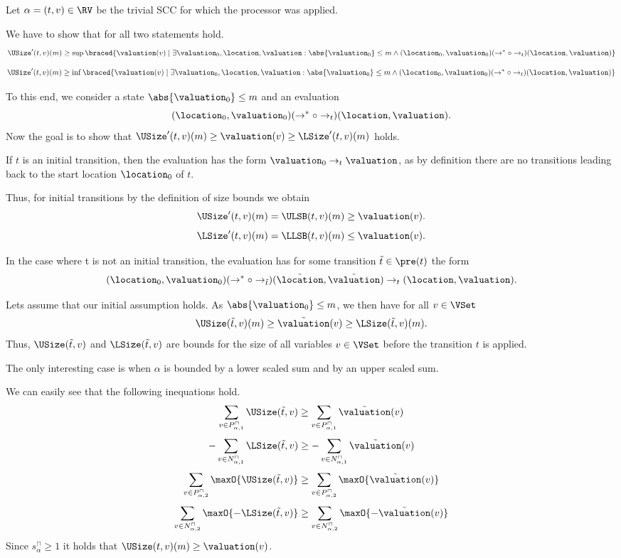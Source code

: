 Let $\alpha = (t, v) \in \RV$ be the trivial SCC for which the processor was applied.

We have to show that for all  two statements hold.
\[ \USize'(t, v)(m) \geq \sup \braced{ \valuation(v) \mid \exists \valuation_0, \location, \valuation: \abs{\valuation_0} \leq m \wedge (\location_0, \valuation_0) (\rightarrow^* \circ \rightarrow_t) (\location, \valuation)} \]
\[ \USize'(t, v)(m) \geq \inf \braced{ \valuation(v) \mid \exists \valuation_0, \location, \valuation: \abs{\valuation_0} \leq m \wedge (\location_0, \valuation_0) (\rightarrow^* \circ \rightarrow_t) (\location, \valuation)} \]

To this end, we consider a state $\abs{\valuation_0} \leq m$ and an evaluation
\[ (\location_0, \valuation_0) (\rightarrow^* \circ \rightarrow_t) (\location, \valuation). \]
Now the goal is to show that $\USize'(t, v)(m) \geq \valuation(v) \geq \LSize'(t, v)(m)$ holds.

If $t$ is an initial transition, then the evaluation has the form $\valuation_0 \rightarrow_t \valuation$, as by definition there are no transitions leading back to the start location $\location_0$ of $t$.

Thus, for initial transitions by the definition of size bounds we obtain
\[ \USize'(t, v)(m) = \ULSB(t, v)(m) \geq \valuation(v). \]
\[ \LSize'(t, v)(m) = \LLSB(t, v)(m) \leq \valuation(v). \]

In the case where t is not an initial transition, the evaluation has for some transition $\tilde{t} \in \pre(t)$ the form
\[ (\location_0, \valuation_0) (\rightarrow^* \circ \rightarrow_{\tilde{t}}) (\tilde{\location}, \tilde{\valuation}) \rightarrow_t (\location, \valuation). \]

Lets assume that our initial assumption holds.
As $\abs{\valuation_0} \leq m$, we then have for all $v \in \VSet$
\[ \USize(\tilde{t}, v)(m) \geq \tilde{\valuation}(v) \geq \LSize(\tilde{t}, v)(m). \]
Thus, $\USize(\tilde{t}, v)$ and $\LSize(\tilde{t}, v)$ are bounds for the size of all variables $v \in \VSet$ before the transition $t$ is applied.

The only interesting case is when $\alpha$ is bounded by a lower scaled sum and by an upper scaled sum.

We can easily see that the following inequations hold.
\[ \sum_{v \in P_{\alpha,1}^\sqcap} \USize(\tilde{t}, v) \geq \sum_{v \in P_{\alpha,1}^\sqcap} \tilde{\valuation}(v) \]
\[ - \sum_{v \in N_{\alpha,1}^\sqcap} \LSize(\tilde{t}, v) \geq - \sum_{v \in N_{\alpha,1}^\sqcap} \tilde{\valuation}(v) \]
\[ \sum_{v \in P_{\alpha,2}^\sqcap} \maxO{\USize(\tilde{t}, v)} \geq \sum_{v \in P_{\alpha,2}^\sqcap} \maxO{\tilde{\valuation}(v)} \]
\[ \sum_{v \in N_{\alpha,2}^\sqcap} \maxO{-\LSize(\tilde{t}, v)} \geq \sum_{v \in N_{\alpha,2}^\sqcap} \maxO{-\tilde{\valuation}(v)} \]
Since $s^\sqcap_\alpha \geq 1$ it holds that $\USize(t, v)(m) \geq \valuation(v)$.

